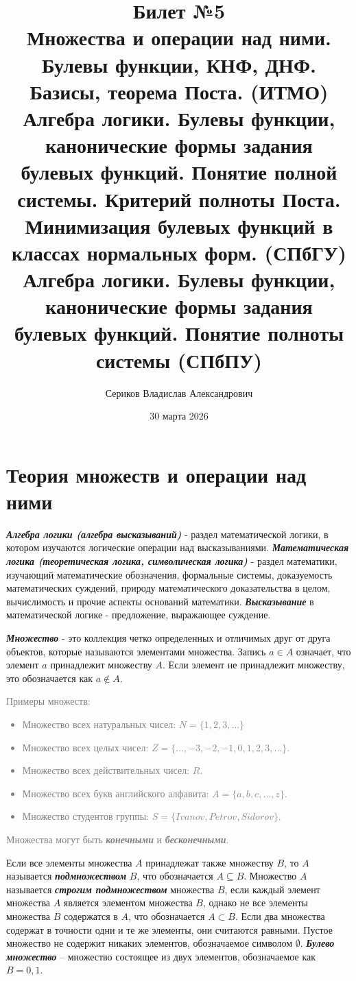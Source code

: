 \documentclass[12pt,letterpaper]{article}
\title{Билет №5 \\ \small Множества и операции над ними. Булевы функции, КНФ, ДНФ. Базисы, теорема Поста. (ИТМО) \\ Алгебра логики. Булевы функции, канонические формы задания булевых функций. Понятие полной системы. Критерий полноты Поста. Минимизация булевых функций в классах нормальных форм. (СПбГУ) \\ Алгебра логики. Булевы функции, канонические формы задания булевых функций. Понятие полноты системы (СПбПУ)
}
\author{Сериков Владислав Александрович}
\date{30 марта 2026}
\begin{document}
\maketitle{}
\tableofcontents{}

\section{Теория множеств и операции над ними}

\textbf{\emph{Алгебра логики (алгебра высказываний)}} - раздел математической логики, в котором изучаются логические операции над высказываниями. \textbf{\emph{Математическая логика (теоретическая логика, символическая логика)}} - раздел математики, изучающий математические обозначения, формальные системы, доказуемость математических суждений, природу математического доказательства в целом, вычислимость и прочие аспекты оснований математики. \textbf{\emph{Высказывание}} в математической логике - предложение, выражающее суждение.

\textbf{\emph{Множество}} - это коллекция четко определенных и отличимых друг от друга объектов, которые называются элементами множества. Запись \(a \in A\) означает, что элемент \(a\) принадлежит множеству \(A\). Если элемент не принадлежит множеству, это обозначается как \(a \notin A\).

\textcolor{gray}{Примеры множеств:
\begin{itemize}
  \item Множество всех натуральных чисел: \(N = \{1, 2, 3, \ldots\} \)
  \item Множество всех целых чисел: \(Z = \{\ldots, -3, -2, -1, 0, 1, 2, 3, \ldots\}\).
  \item Множество всех действительных чисел: \(R\).
  \item Множество всех букв английского алфавита: \(A = \{a, b, c, \ldots, z\}\).
  \item Множество студентов группы: \(S = \{Ivanov, Petrov, Sidorov\}\).
\end{itemize}
Множества могут быть \textbf{\emph{конечными}} и \textbf{\emph{бесконечными}}.}

Если все элементы множества \(A\) принадлежат также множеству \(B\), то \(A\) называется \textbf{\emph{подмножеством}} \(B\), что обозначается \(A \subseteq B\). Множество \(A\) называется \textbf{\emph{строгим подмножеством}} множества \(B\), если каждый элемент множества \(A\) является элементом множества \(B\), однако не все элементы множества  \(B\)  содержатся в  \(A\), что обозначается \(A \subset B\). Если два множества содержат в точности одни и те же элементы, они считаются равными. Пустое множество  не содержит никаких элементов, обозначаемое символом \(\emptyset\). \textbf{\emph{Булево множество}} – множество состоящее из двух элементов, обозначаемое как \(B = {0, 1}\).
\end{document}
